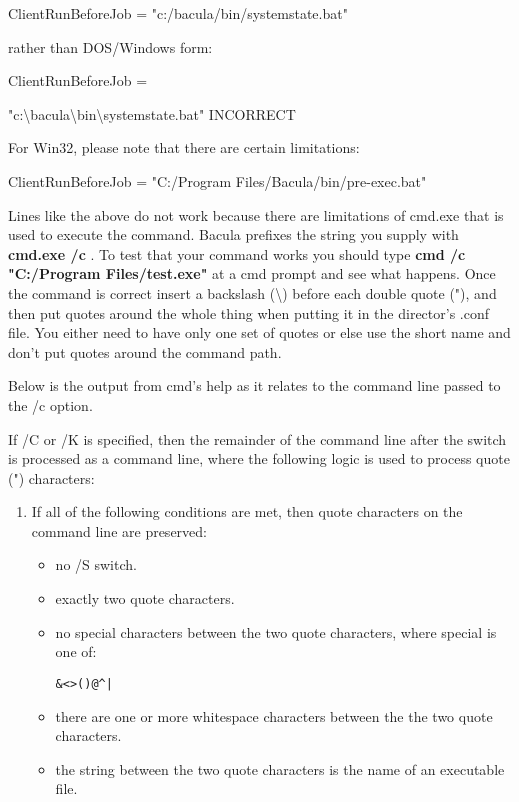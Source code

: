 \begin{description}
\begin{enumerate}
      ClientRunBeforeJob = "c:/bacula/bin/systemstate.bat"  
   
   rather than DOS/Windows form:  
   
   ClientRunBeforeJob =

"c:\textbackslash{}bacula\textbackslash{}bin\textbackslash{}systemstate.bat"
   INCORRECT 
   \end{enumerate}

For Win32, please note that there are certain limitations:  

ClientRunBeforeJob = "C:/Program Files/Bacula/bin/pre-exec.bat"

Lines like the above do not work because there are limitations of
cmd.exe that is used to execute the command.
Bacula prefixes the string you supply with {\bf cmd.exe /c }.  To test that
your command works you should type {\bf cmd /c "C:/Program Files/test.exe"} at a
cmd prompt and see what happens.  Once the command is correct insert a
backslash (\textbackslash{}) before each double quote ("), and
then put quotes around the whole thing when putting it in
the director's .conf file.  You either need to have only one set of quotes
or else use the short name and don't put quotes around the command path.
 
Below is the output from cmd's help as it relates to the command line
passed to the /c option.
 
 
 If /C or /K is specified, then the remainder of the command line after
 the switch is processed as a command line, where the following logic is
 used to process quote (") characters:
 
\begin{enumerate}
\item 
     If all of the following conditions are met, then quote characters
         on the command line are preserved:
    \begin{itemize}
       \item no /S switch.
       \item exactly two quote characters.
       \item no special characters between the two quote characters,
           where special is one of: 
\begin{verbatim}
&<>()@^| 
\end{verbatim}
       \item there are one or more whitespace characters between the
           the two quote characters.
       \item the string between the two quote characters is the name
           of an executable file.
    \end{itemize}
 

\end{enumerate}
\end{description}
